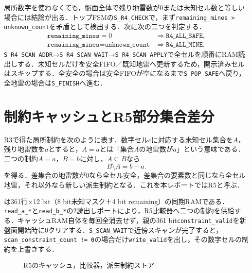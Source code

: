 局所数字を使わなくても，盤面全体で残り地雷数が0または未知セル数と等しい場合には結論が出る．トップFSMの\texttt{S\_R4\_CHECK}で，まず\texttt{remaining\_mines > unknown\_count}を矛盾として検出する．次に次の二つを判定する．
\begin{align}
  \texttt{remaining\_mines}=0 &\Rightarrow \texttt{R4\_ALL\_SAFE},\\
  \texttt{remaining\_mines}=\texttt{unknown\_count} &\Rightarrow \texttt{R4\_ALL\_MINE}.
\end{align}
\texttt{S\_R4\_SCAN\_ADDR}→\texttt{S\_R4\_SCAN\_WAIT}→\texttt{S\_R4\_SCAN\_APPLY}で全セルを順番にRAM読出しする．未知セルだけを安全FIFO／既知地雷へ更新するため，開示済みセルはスキップする．全安全の場合は安全FIFOが空になるまで\texttt{S\_POP\_SAFE}へ戻り，全地雷の場合は\texttt{S\_FINISH}へ進む．

\section{制約キャッシュとR5部分集合差分}
\label{sec:solver-r5}

R3で得た局所制約を次のように表す．数字セル$c$に対応する未知セル集合を$A$，残り地雷数を$a$とすると，$A=a$とは「集合$A$の地雷数が$a$」という意味である．二つの制約$A=a$，$B=b$に対し，$A\subseteq B$なら
\begin{equation}
  B\setminus A=b-a.
  \label{eq:r5-subset}
\end{equation}
を得る．差集合の地雷数が0なら全セル安全，差集合の要素数と同じなら全セル地雷，それ以外なら新しい派生制約となる．これを本レポートではR5と呼ぶ．

は361行×12 bit（8 bit未知マスク＋4 bit remaining）の同期RAMである．\texttt{read\_a\_*}と\texttt{read\_b\_*}の2読出しポートにより，R5比較器へ二つの制約を供給する．キャッシュRAM自体を毎回全消去せず，親の361 bit\texttt{constraint\_valid}を新盤面開始時に0クリアする．\texttt{S\_SCAN\_WAIT}で近傍スキャンが完了すると，\texttt{scan\_constraint\_count != 0}の場合だけ\texttt{write\_valid}を出し，その数字セルの制約を上書きする．

\begin{figure}[tb]
  \centering
  \caption{R5のキャッシュ，比較器，派生制約ストア}
  \label{fig:r5-wiring}
\end{figure}

